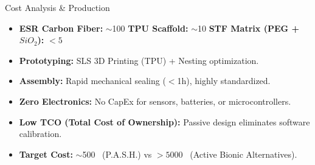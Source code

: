 \begin{frame}{Cost Analysis \& Production }
   
    \begin{tcolorbox}[enhanced, title=\textbf{1. Bill of Materials (Unit Cost)}, 
        colframe=blue!80!black, colback=blue!5, 
        boxrule=0.5mm, arc=1.5mm, drop fuzzy shadow]
        \begin{itemize}
            \item \textbf{ESR Carbon Fiber:} $\sim$100 \texteuro  \hspace{0.05cm}
                  \textbf{TPU Scaffold:} $\sim$10 \texteuro \hspace{0.05cm}
                  \textbf{STF Matrix (PEG + $SiO_2$):} $<5$ \texteuro
        \end{itemize}
    \end{tcolorbox}
    


    \begin{tcolorbox}[enhanced, title=\textbf{2. Production \& Assembly}, 
        colframe=gray!80!black, colback=gray!5, 
        boxrule=0.5mm, arc=1.5mm, drop fuzzy shadow]
        \begin{itemize}
            \item \textbf{Prototyping:} SLS 3D Printing (TPU) + Nesting optimization.
            \item \textbf{Assembly:} Rapid mechanical sealing ($<$1h), highly standardized.
        \end{itemize}
    \end{tcolorbox}
    

    \begin{tcolorbox}[enhanced, title=\textbf{3. Market Disruption}, 
        colframe=red!70!black, colback=red!5, 
        boxrule=0.5mm, arc=1.5mm, drop fuzzy shadow]
        \begin{itemize}
            \item \textbf{Zero Electronics:} No CapEx for sensors, batteries, or microcontrollers.
            \item \textbf{Low TCO (Total Cost of Ownership):} Passive design eliminates software calibration.
            \item \textbf{Target Cost:} $\sim$500 \texteuro \ (P.A.S.H.) vs $>5000$ \texteuro \ (Active Bionic Alternatives).
        \end{itemize}
    \end{tcolorbox}

\end{frame}